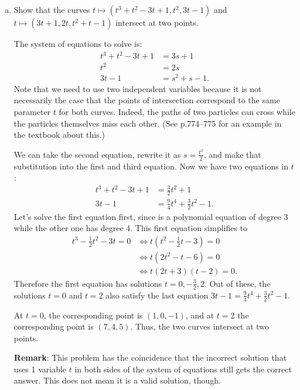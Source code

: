 \documentclass[11pt,oneside]{amsart}
\theoremstyle{definition}
\begin{document}
\begin{problem}\leavevmode
  \begin{enumerate}[(a)]
    \item Show that the curves $t\mapsto (t^3+t^2-3t+1,t^2,3t-1)$ and $t\mapsto(3t+1,2t,t^2+t-1)$ intersect at two points.
    \begin{solution}
      The system of equations to solve is:
      \begin{align*}
        t^3+t^2-3t+1 &= 3s+1\\
        t^2 &= 2s\\
        3t-1 &= s^2+s-1.
      \end{align*}
      Note that we need to use two independent variables because it is not necessarily the case that the points of intersection correspond to the same parameter $t$ for both curves. Indeed, the paths of two particles can cross while the particles themselves miss each other. (See p.774--775 for an example in the textbook about this.)

      We can take the second equation, rewrite it as $s=\frac{t^2}2$, and make that substitution into the first and third equation. Now we have two equations in $t$:
      \begin{align*}
        t^3+t^2-3t+1 &= \frac32t^2+1\\
        3t-1 &= \frac94t^4+\frac32t^2-1.
      \end{align*}
      Let's solve the first equation first, since is a polynomial equation of degree 3 while the other one has degree 4. This first equation simplifies to
      \[\begin{split}
        t^3-\frac12t^2-3t=0 &\iff t\left(t^2-\frac12t-3\right)=0\\
        &\iff t(2t^2-t-6)=0\\
        &\iff t(2t+3)(t-2)=0.
      \end{split}\]
      Therefore the first equation has solutions $t=0,-\frac32,2$. Out of these, the solutions $t=0$ and $t=2$ also satisfy the last equation $3t-1=\frac94t^4+\frac32t^2-1$.

      At $t=0$, the corresponding point is $(1,0,-1)$, and at $t=2$ the corresponding point is $(7,4,5)$. Thus, the two curves intersect at two points.

      \textbf{Remark}: This problem has the coincidence that the incorrect solution that uses 1 variable $t$ in both sides of the system of equations still gets the correct answer. This does not mean it is a valid solution, though.
    \end{solution}
   
  \end{enumerate}
\end{problem}
\end{document}

